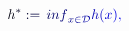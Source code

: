 \documentclass[12pt]{article}
\begin{document}
\makeatletter
\renewcommand*{\@textcolor}[3]{%
  \protect\leavevmode
  \begingroup
    \color#1{#2}#3%
  \endgroup
}
\makeatother
\begin{displaymath}
\mathcolor[RGB]{0,0,15}{h} ^ { \mathcolor[RGB]{0,0,30}{*} } \mathcolor[RGB]{0,0,45}{:} \mathcolor[RGB]{0,0,60}{=} \mathcolor[RGB]{0,0,75}{\operatorname*} { \mathcolor[RGB]{0,0,90}{i} \mathcolor[RGB]{0,0,105}{n} \mathcolor[RGB]{0,0,120}{f} } _ { \mathcolor[RGB]{0,0,135}{x} \mathcolor[RGB]{0,0,150}{\in} \mathcal { \mathcolor[RGB]{0,0,165}{D} } } \mathcolor[RGB]{0,0,180}{h} \mathcolor[RGB]{0,0,195}{(} \mathcolor[RGB]{0,0,210}{x} \mathcolor[RGB]{0,0,225}{)} \mathcolor[RGB]{0,0,240}{,}
\end{displaymath}
\end{document}
